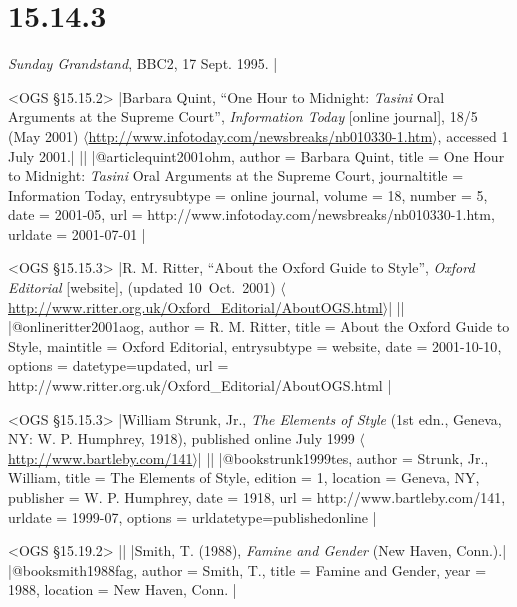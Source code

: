 \documentclass[extrafontsizes,11pt,a4paper,oneside]{memoir}
\begin{document}
\section*{15.14.3} %

\emph{Sunday Grandstand}, BBC2, 17 Sept. 1995.
|

\bibexample<OGS \S15.15.2>
|Barbara Quint, \enquote{One Hour to Midnight: \emph{Tasini} Oral Arguments at the Supreme Court}, \emph{Information Today} [online journal], 18/5 (May 2001) $\langle$\url{http://www.infotoday.com/newsbreaks/nb010330-1.htm}$\rangle$, accessed 1 July 2001.|%
||%
|@article{quint2001ohm,
  author = {Barbara Quint},
  title = {One Hour to Midnight: \emph{Tasini} Oral Arguments at the Supreme Court},
  journaltitle = {Information Today},
  entrysubtype = {online journal},
  volume = {18},
  number = {5},
  date = {2001-05},
  url = {http://www.infotoday.com/newsbreaks/nb010330-1.htm},
  urldate = {2001-07-01}
}|

\bibexample<OGS \S15.15.3>
|R. M. Ritter, \enquote{About the Oxford Guide to Style}, \emph{Oxford Editorial} [website], (updated 10~Oct.\ 2001) $\langle$\url{http://www.ritter.org.uk/Oxford_Editorial/AboutOGS.html}$\rangle$|%
||%
|@online{ritter2001aog,
  author = {R. M. Ritter},
  title = {About the Oxford Guide to Style},
  maintitle = {Oxford Editorial},
  entrysubtype = {website},
  date = {2001-10-10},
  options = {datetype=updated},
  url = {http://www.ritter.org.uk/Oxford_Editorial/AboutOGS.html}
}|

\bibexample<OGS \S15.15.3>
|William Strunk, Jr., \emph{The Elements of Style} (1st edn., Geneva, NY: W. P. Humphrey, 1918), published online July 1999 $\langle$\url{http://www.bartleby.com/141}$\rangle$|%
||%
|@book{strunk1999tes,
  author = {Strunk, Jr., William},
  title = {The Elements of Style},
  edition = {1},
  location = {Geneva, NY},
  publisher = {W. P. Humphrey},
  date = {1918},
  url = {http://www.bartleby.com/141},
  urldate = {1999-07},
  options = {urldatetype=published{\space}online}
}|

\bibexample<OGS \S15.19.2>
||%
|Smith, T. (1988), \emph{Famine and Gender} (New Haven, Conn.).|%
|@book{smith1988fag,
  author = {Smith, T.},
  title = {Famine and Gender},
  year = {1988},
  location = {New Haven, Conn.}
}|

\end{document}
